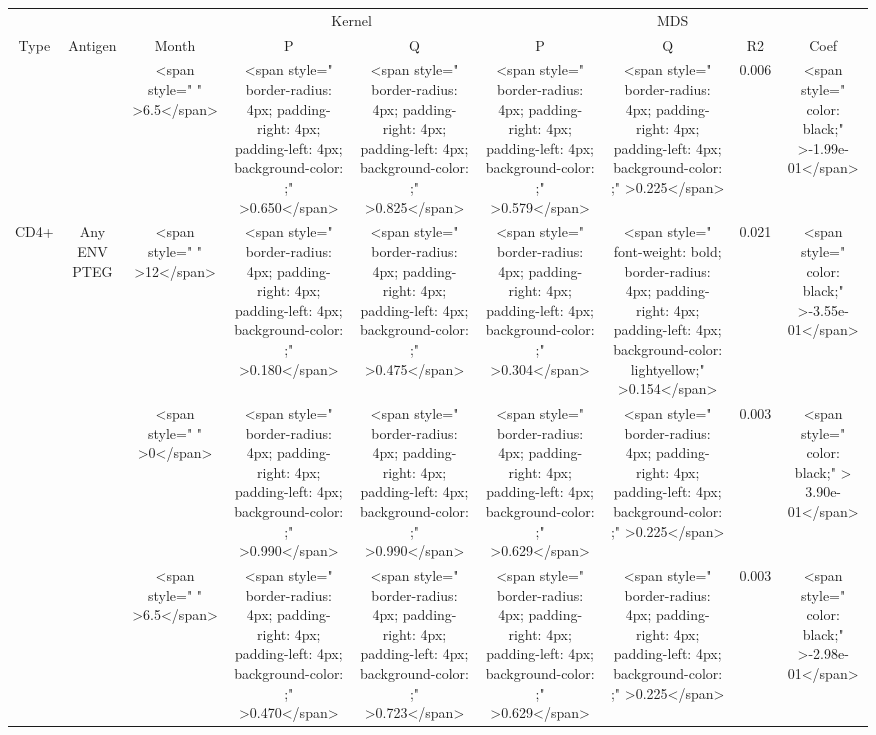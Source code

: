 
\begin{tabular}{c|c|c|c|c|c|c|c|c}
\hline
\multicolumn{3}{c|}{ } & \multicolumn{2}{|c|}{Kernel} & \multicolumn{4}{|c}{MDS} \\
\cline{4-5} \cline{6-9}
Type & Antigen & Month & P & Q & P & Q & R2 & Coef\\
\hline
 &  & <span style="     " >6.5</span> & <span style="     border-radius: 4px; padding-right: 4px; padding-left: 4px; background-color: ;" >0.650</span> & <span style="     border-radius: 4px; padding-right: 4px; padding-left: 4px; background-color: ;" >0.825</span> & <span style="     border-radius: 4px; padding-right: 4px; padding-left: 4px; background-color: ;" >0.579</span> & <span style="     border-radius: 4px; padding-right: 4px; padding-left: 4px; background-color: ;" >0.225</span> & 0.006 & <span style="     color: black;" >-1.99e-01</span>\\
\cline{3-9}
\multirow{-2}{*}{\centering\arraybackslash CD4+} & \multirow{-2}{*}{\centering\arraybackslash Any ENV PTEG} & <span style="     " >12</span> & <span style="     border-radius: 4px; padding-right: 4px; padding-left: 4px; background-color: ;" >0.180</span> & <span style="     border-radius: 4px; padding-right: 4px; padding-left: 4px; background-color: ;" >0.475</span> & <span style="     border-radius: 4px; padding-right: 4px; padding-left: 4px; background-color: ;" >0.304</span> & <span style=" font-weight: bold;    border-radius: 4px; padding-right: 4px; padding-left: 4px; background-color: lightyellow;" >0.154</span> & 0.021 & <span style="     color: black;" >-3.55e-01</span>\\
\cline{1-9}
 &  & <span style="     " >0</span> & <span style="     border-radius: 4px; padding-right: 4px; padding-left: 4px; background-color: ;" >0.990</span> & <span style="     border-radius: 4px; padding-right: 4px; padding-left: 4px; background-color: ;" >0.990</span> & <span style="     border-radius: 4px; padding-right: 4px; padding-left: 4px; background-color: ;" >0.629</span> & <span style="     border-radius: 4px; padding-right: 4px; padding-left: 4px; background-color: ;" >0.225</span> & 0.003 & <span style="     color: black;" > 3.90e-01</span>\\
\cline{3-9}
 &  & <span style="     " >6.5</span> & <span style="     border-radius: 4px; padding-right: 4px; padding-left: 4px; background-color: ;" >0.470</span> & <span style="     border-radius: 4px; padding-right: 4px; padding-left: 4px; background-color: ;" >0.723</span> & <span style="     border-radius: 4px; padding-right: 4px; padding-left: 4px; background-color: ;" >0.629</span> & <span style="     border-radius: 4px; padding-right: 4px; padding-left: 4px; background-color: ;" >0.225</span> & 0.003 & <span style="     color: black;" >-2.98e-01</span>\\

\end{tabular}
